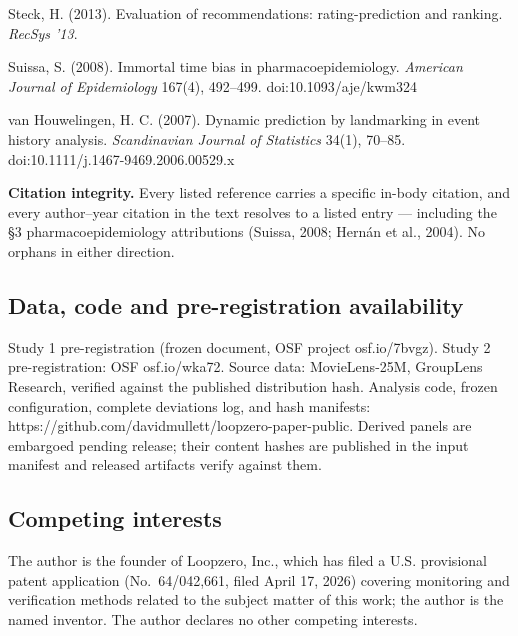 \documentclass[
  11pt,
]{article}
\begin{document}
Steck, H. (2013). Evaluation of recommendations: rating-prediction and
ranking. \emph{RecSys '13}.

Suissa, S. (2008). Immortal time bias in pharmacoepidemiology.
\emph{American Journal of Epidemiology} 167(4), 492--499.
doi:10.1093/aje/kwm324

van Houwelingen, H. C. (2007). Dynamic prediction by landmarking in
event history analysis. \emph{Scandinavian Journal of Statistics} 34(1),
70--85. doi:10.1111/j.1467-9469.2006.00529.x

\textbf{Citation integrity.} Every listed reference carries a specific
in-body citation, and every author--year citation in the text resolves
to a listed entry --- including the §3 pharmacoepidemiology attributions
(Suissa, 2008; Hernán et al., 2004). No orphans in either direction.

\subsection{Data, code and pre-registration
availability}\label{data-code-and-pre-registration-availability}

Study 1 pre-registration (frozen document, OSF project osf.io/7bvgz).
Study 2 pre-registration: OSF osf.io/wka72. Source data: MovieLens-25M,
GroupLens Research, verified against the published distribution hash.
Analysis code, frozen configuration, complete deviations log, and hash
manifests: https://github.com/davidmullett/loopzero-paper-public.
Derived panels are embargoed pending release; their content hashes are
published in the input manifest and released artifacts verify against
them.

\subsection{Competing interests}\label{competing-interests}

The author is the founder of Loopzero, Inc., which has filed a U.S.
provisional patent application (No.~64/042,661, filed April 17, 2026)
covering monitoring and verification methods related to the subject
matter of this work; the author is the named inventor. The author
declares no other competing interests.
\end{document}
